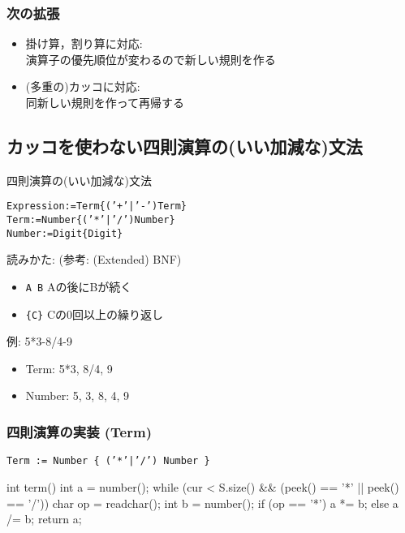 \subsubsection{次の拡張}
  \begin{itemize}
\setlength{\itemsep}{0pt}
  \item 掛け算，割り算に対応: \\
    演算子の優先順位が変わるので新しい規則を作る
  \item (多重の)カッコに対応: \\
    同新しい規則を作って再帰する
  \end{itemize}

\subsection{カッコを使わない四則演算の(いい加減な)文法}

\begin{itembox}[l]{四則演算の(いい加減な)文法}
  \begin{alltt}
Expression := Term \{ ('+'|'-') Term \}
Term := Number \{ ('*'|'/') Number \}
Number := Digit \{ Digit \}
\end{alltt}
\end{itembox}

読みかた: (参考: (Extended) BNF)
\begin{itemize}
\setlength{\itemsep}{0pt}
\item \texttt{A B} \dingright Aの後にBが続く
\item \texttt{\{C\}} \dingright Cの0回以上の繰り返し
\end{itemize}

例: 5*3-8/4-9
\begin{itemize}
\setlength{\itemsep}{0pt}
\item Term: 5*3, 8/4, 9
\item Number: 5, 3, 8, 4, 9
\end{itemize}

\subsubsection{四則演算の実装 (Term)}
\texttt{\textcolor{ired}{Term := Number \{ ('*'|'/') Number \}}}

  \begin{cbox}[emph={term},emph={[2]number,*,/}]
int term() {
  int a = number();
  while (cur < S.size() 
        && (peek() == '*' || peek() == '/')) {
    char op = readchar();
    int b = number();
    if (op == '*') a *= b; else a /= b;
  }
  return a;
}
\end{cbox}

